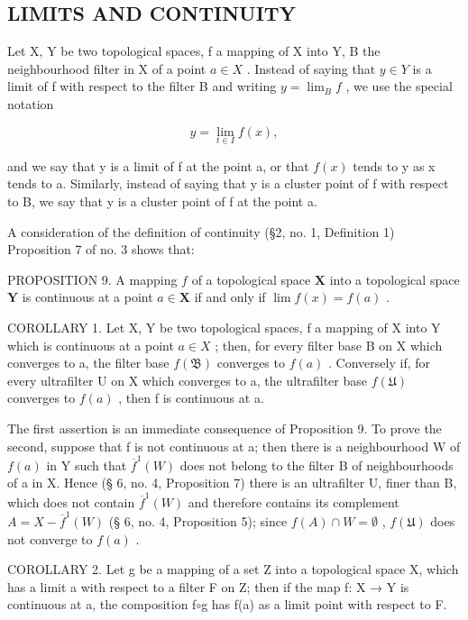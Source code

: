 \subsection{LIMITS AND CONTINUITY}

Let X, Y be two topological spaces, f a mapping of X into Y, B the neighbourhood filter in X of a point \(a \in X\) . Instead of saying that \(y \in Y\) is a limit of f with respect to the filter B and writing \(y = \lim_{B} f\) , we use the special notation

\[
y = \lim _ {t \in I} f (x),
\]

and we say that y is a limit of f at the point a, or that \(f(x)\) tends to y as x tends to a. Similarly, instead of saying that y is a cluster point of f with respect to B, we say that y is a cluster point of f at the point a.

A consideration of the definition of continuity (§2, no. 1, Definition 1) Proposition 7 of no. 3 shows that:

PROPOSITION 9. A mapping \(f\) of a topological space \(\mathbf{X}\) into a topological space \(\mathbf{Y}\) is continuous at a point \(a \in \mathbf{X}\) if and only if \(\lim f(x) = f(a)\) .

COROLLARY 1. Let X, Y be two topological spaces, f a mapping of X into Y which is continuous at a point \(a \in X\) ; then, for every filter base B on X which converges to a, the filter base \(f(\mathfrak{B})\) converges to \(f(a)\) . Conversely if, for every ultrafilter U on X which converges to a, the ultrafilter base \(f(\mathfrak{U})\) converges to \(f(a)\) , then f is continuous at a.

The first assertion is an immediate consequence of Proposition 9. To prove the second, suppose that f is not continuous at a; then there is a neighbourhood W of \(f(a)\) in Y such that \(\overline{f}^{1}(W)\) does not belong to the filter B of neighbourhoods of a in X. Hence (§ 6, no. 4, Proposition 7) there is an ultrafilter U, finer than B, which does not contain \(\overline{f}^{1}(W)\) and therefore contains its complement \(A = X - \overline{f}^{1}(W)\) (§ 6, no. 4, Proposition 5); since \(f(A) \cap W = \emptyset\) , \(f(\mathfrak{U})\) does not converge to \(f(a)\) .

COROLLARY 2. Let g be a mapping of a set Z into a topological space X, which has a limit a with respect to a filter F on Z; then if the map f: X → Y is continuous at a, the composition f\(\circ\)g has f(a) as a limit point with respect to F.

